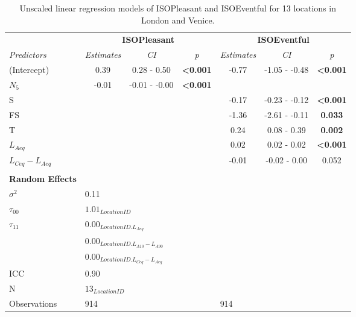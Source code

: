 \begin{table*}[ht!]
\centering
\caption{Unscaled linear regression models of ISOPleasant and ISOEventful for 13 locations in London and Venice.}
\label{tab:unscl}
\def\arraystretch{.5}
\begin{tabular}{@{}l|lccccc@{}}
\toprule
\multicolumn{1}{l|}{} &
  \multicolumn{3}{c}{\textbf{ISOPleasant}} &
  \multicolumn{3}{c}{\textbf{ISOEventful}} \\
\textit{Predictors} &
  \multicolumn{1}{c}{\textit{Estimates}} &
  \textit{CI} &
  \textit{p} &
  \textit{Estimates} &
  \textit{CI} &
  \textit{p} \\ \midrule
(Intercept) &
  \multicolumn{1}{c}{0.39} &
  0.28 - 0.50 &
  \textbf{\textless{}0.001} &
  -0.77 &
  -1.05 - -0.48 &
  \textbf{\textless{}0.001} \\
$N_5$ &
  \multicolumn{1}{c}{-0.01} &
  -0.01 - -0.00 &
  \textbf{\textless{}0.001} &
  &
  &
  \\
S &
  \multicolumn{1}{c}{} &
  &
  &
  -0.17 &
  -0.23 - -0.12 &
  \textbf{\textless{}0.001} \\
FS &
  \multicolumn{1}{c}{} &
  &
  &
  -1.36 &
  -2.61 - -0.11 &
  \textbf{0.033} \\
T &
  \multicolumn{1}{c}{} &
  &
  &
  0.24 &
  0.08 - 0.39 &
  \textbf{0.002} \\
$L_{Aeq}$ &
  \multicolumn{1}{c}{} &
  &
  &
  0.02 &
  0.02 - 0.02 &
  \textbf{\textless{}0.001} \\
$L_{Ceq}-L_{Aeq}$ &
  \multicolumn{1}{c}{} &
  &
  &
  -0.01 &
  -0.02 - 0.00 &
  0.052 \\
  \\
\textbf{Random Effects} &     & \multicolumn{1}{l}{} & \multicolumn{1}{l}{} & \multicolumn{1}{l}{}    & \multicolumn{1}{l}{} & \multicolumn{1}{l}{} \\
$\sigma^2$ &
  0.11 &
  \multicolumn{1}{l}{} &
  \multicolumn{1}{l}{} &
  \multicolumn{1}{l}{} &
  \multicolumn{1}{l}{} &
  \multicolumn{1}{l}{} \\
$\tau_{00}$ &
  \multicolumn{6}{l}{$1.01_{LocationID}$} \\
$\tau_{11}$ &
  \multicolumn{6}{l}{$0.00_{LocationID.L_{Aeq}}$} \\
 &
  \multicolumn{6}{l}{$0.00_{LocationID.L_{A10}-L_{A90}}$} \\
 &
  \multicolumn{6}{l}{$0.00_{LocationID.L_{Ceq}-L_{Aeq}}$} \\
ICC &
  0.90 &
  \multicolumn{1}{l}{} &
  \multicolumn{1}{l}{} &
  \multicolumn{1}{l}{} &
  \multicolumn{1}{l}{} &
  \multicolumn{1}{l}{} \\ \midrule
N &
  \multicolumn{6}{l}{$13_{LocationID}$} \\
Observations            & 914 & \multicolumn{1}{l}{} & \multicolumn{1}{l}{} & \multicolumn{1}{l}{914} & \multicolumn{1}{l}{} & \multicolumn{1}{l}{} \\ \bottomrule
\end{tabular}
\end{table*}

